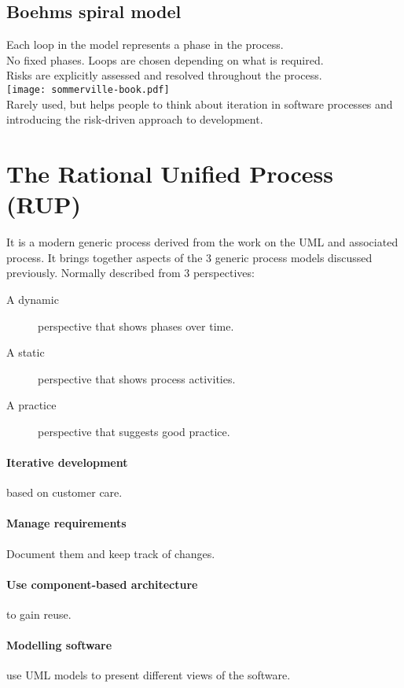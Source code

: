 \documentclass[a4paper,11pt,twocolumn]{report}
\begin{document}
    \subsection{Boehms spiral model}
    Each loop in the model represents a phase in the process.\\
    No fixed phases. Loops are chosen depending on what is required.\\
    Risks are explicitly assessed and resolved throughout the process.\\
    \texttt{[image: sommerville-book.pdf]}\\
    Rarely used, but helps people to think about iteration in software
    processes and introducing the risk-driven approach to development.
    \section{The Rational Unified Process (RUP)}
    It is a modern generic process derived from the work on the UML and
    associated process. It brings together aspects of the 3 generic process
    models discussed previously. Normally described from 3 perspectives:
    \begin{description}
        \item[A dynamic] perspective that shows phases over time.
        \item[A static] perspective that shows process activities.
        \item[A practice] perspective that suggests good practice.
    \end{description}
    \paragraph{Iterative development} based on customer care.
    \paragraph{Manage requirements} Document them and keep track of changes.
    \paragraph{Use component-based architecture} to gain reuse.
    \paragraph{Modelling software} use UML models to present different views of
    the software.
\end{document}
